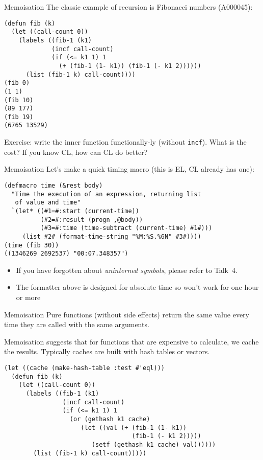 \documentclass[presentation]{beamer}
\begin{document}
\begin{frame}[fragile]{Memoisation}
The classic example of recursion is Fibonacci numbers (A000045):
\begin{verbatim}
(defun fib (k)
  (let ((call-count 0))
    (labels ((fib-1 (k1)
             (incf call-count)
             (if (<= k1 1) 1
               (+ (fib-1 (1- k1)) (fib-1 (- k1 2))))))
      (list (fib-1 k) call-count))))
(fib 0)
(1 1)
(fib 10)
(89 177)
(fib 19)
(6765 13529)
\end{verbatim}
Exercise: write the inner function functionally-ly (without \texttt{incf}).  What is the cost?  If you know CL, how can CL do better?
\end{frame}

\begin{frame}[fragile]{Memoisation}
Let's make a quick timing macro (this is EL, CL already has one):
\begin{verbatim}
(defmacro time (&rest body)
  "Time the execution of an expression, returning list
   of value and time"
  `(let* ((#1=#:start (current-time))
          (#2=#:result (progn ,@body))
          (#3=#:time (time-subtract (current-time) #1#)))
     (list #2# (format-time-string "%M:%S.%6N" #3#))))
(time (fib 30))
((1346269 2692537) "00:07.348357")
\end{verbatim}
\begin{itemize}
\item If you have forgotten about \emph{uninterned symbols}, please refer to Talk~4.
\item The formatter above is designed for absolute time so won't work for one hour or more
\end{itemize}
\end{frame}

\begin{frame}[fragile]{Memoisation}
Pure functions (without side effects) return the same value every time they are called with the same arguments.

  \medskip
  Memoisation suggests that for functions that are expensive to calculate, we cache the results.  Typically caches are built with hash tables or vectors.
\begin{verbatim}
(let ((cache (make-hash-table :test #'eql)))
  (defun fib (k)
    (let ((call-count 0))
      (labels ((fib-1 (k1)
                (incf call-count)
                (if (<= k1 1) 1
                  (or (gethash k1 cache)
                     (let ((val (+ (fib-1 (1- k1))
                                   (fib-1 (- k1 2)))))
                        (setf (gethash k1 cache) val))))))
        (list (fib-1 k) call-count)))))
\end{verbatim}

\end{frame}
\end{document}
